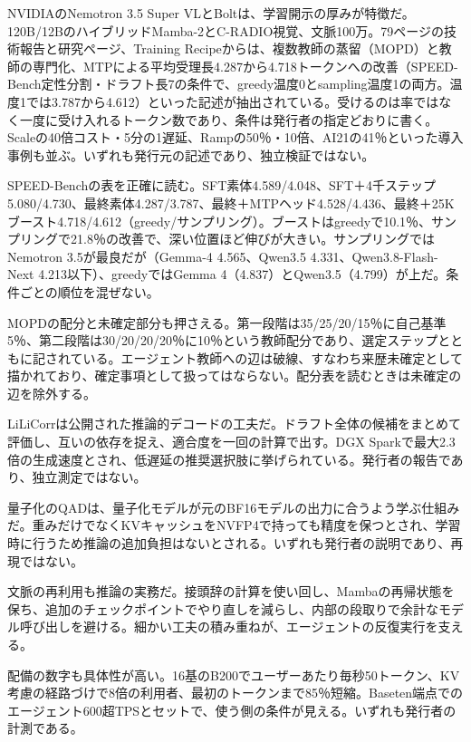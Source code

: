 \documentclass[lualatex,a4paper,10pt]{jlreq}
\begin{document}
NVIDIAのNemotron 3.5 Super VLとBoltは、学習開示の厚みが特徴だ。120B/12BのハイブリッドMamba-2とC-RADIO視覚、文脈100万。79ページの技術報告と研究ページ、Training Recipeからは、複数教師の蒸留（MOPD）と教師の専門化、MTPによる平均受理長4.287から4.718トークンへの改善（SPEED-Bench定性分割・ドラフト長7の条件で、greedy温度0とsampling温度1の両方。温度1では3.787から4.612）といった記述が抽出されている。受けるのは率ではなく一度に受け入れるトークン数であり、条件は発行者の指定どおりに書く。Scaleの40倍コスト・5分の1遅延、Rampの50％・10倍、AI21の41％といった導入事例も並ぶ。いずれも発行元の記述であり、独立検証ではない。
\cite{B20,B21,B22}


SPEED-Benchの表を正確に読む。SFT素体4.589/4.048、SFT＋4千ステップ5.080/4.730、最終素体4.287/3.787、最終＋MTPヘッド4.528/4.436、最終＋25Kブースト4.718/4.612（greedy/サンプリング）。ブーストはgreedyで10.1％、サンプリングで21.8％の改善で、深い位置ほど伸びが大きい。サンプリングではNemotron 3.5が最良だが（Gemma-4 4.565、Qwen3.5 4.331、Qwen3.8-Flash-Next 4.213以下）、greedyではGemma 4（4.837）とQwen3.5（4.799）が上だ。条件ごとの順位を混ぜない。
\cite{B20,B21,B22}


MOPDの配分と未確定部分も押さえる。第一段階は35/25/20/15％に自己基準5％、第二段階は30/20/20/20％に10％という教師配分であり、選定ステップとともに記されている。エージェント教師への辺は破線、すなわち来歴未確定として描かれており、確定事項として扱ってはならない。配分表を読むときは未確定の辺を除外する。
\cite{B20,B21,B22}


LiLiCorrは公開された推論的デコードの工夫だ。ドラフト全体の候補をまとめて評価し、互いの依存を捉え、適合度を一回の計算で出す。DGX Sparkで最大2.3倍の生成速度とされ、低遅延の推奨選択肢に挙げられている。発行者の報告であり、独立測定ではない。
\cite{B20,B21,B22}


量子化のQADは、量子化モデルが元のBF16モデルの出力に合うよう学ぶ仕組みだ。重みだけでなくKVキャッシュをNVFP4で持っても精度を保つとされ、学習時に行うため推論の追加負担はないとされる。いずれも発行者の説明であり、再現ではない。
\cite{B20,B21,B22}


文脈の再利用も推論の実務だ。接頭辞の計算を使い回し、Mambaの再帰状態を保ち、追加のチェックポイントでやり直しを減らし、内部の段取りで余計なモデル呼び出しを避ける。細かい工夫の積み重ねが、エージェントの反復実行を支える。
\cite{B20,B21,B22}


配備の数字も具体性が高い。16基のB200でユーザーあたり毎秒50トークン、KV考慮の経路づけで8倍の利用者、最初のトークンまで85％短縮。Baseten端点でのエージェント600超TPSとセットで、使う側の条件が見える。いずれも発行者の計測である。
\cite{B20,B21,B22}
\end{document}
